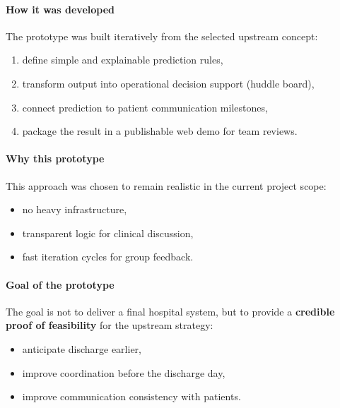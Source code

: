{\paragraph{How it was developed}
The prototype was built iteratively from the selected upstream concept:
\begin{enumerate}
  \item define simple and explainable prediction rules,
  \item transform output into operational decision support (huddle board),
  \item connect prediction to patient communication milestones,
  \item package the result in a publishable web demo for team reviews.
\end{enumerate}

\paragraph{Why this prototype}
This approach was chosen to remain realistic in the current project scope:
\begin{itemize}
  \item no heavy infrastructure,
  \item transparent logic for clinical discussion,
  \item fast iteration cycles for group feedback.
\end{itemize}

\paragraph{Goal of the prototype}
The goal is not to deliver a final hospital system, but to provide a \textbf{credible proof of feasibility} for the upstream strategy:
\begin{itemize}
  \item anticipate discharge earlier,
  \item improve coordination before the discharge day,
  \item improve communication consistency with patients.
\end{itemize}
}
